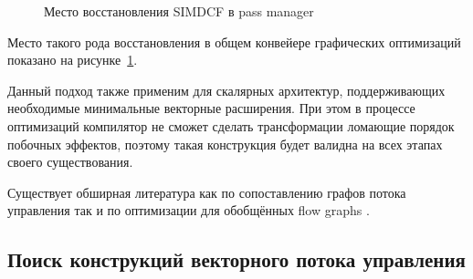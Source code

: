 \begin{figure}[ht]
    \caption{Место восстановления SIMDCF в pass manager}\label{fig:simdcf-gen}
\end{figure}

Место такого рода восстановления в общем конвейере графических оптимизаций показано на рисунке~\cref{fig:simdcf-gen}.

Данный подход также применим для скалярных архитектур, поддерживающих необходимые минимальные векторные расширения. При этом в процессе оптимизаций компилятор не сможет сделать трансформации ломающие порядок побочных эффектов, поэтому такая конструкция будет валидна на всех этапах своего существования.

Существует обширная литература как по сопоставлению графов потока управления \cite{matoussi2019loop} так и по оптимизации для обобщённых flow graphs \cite{mansky2016specifying}.

\subsection{Поиск конструкций векторного потока управления}\label{sec:lowering/simdcf/optimization}

